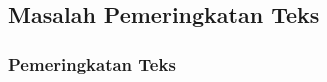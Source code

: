 \chapter{\babDua}
\label{bab:2}

\noindent\todo{

}

\section{Masalah Pemeringkatan Teks}
\subsection{Pemeringkatan Teks}
